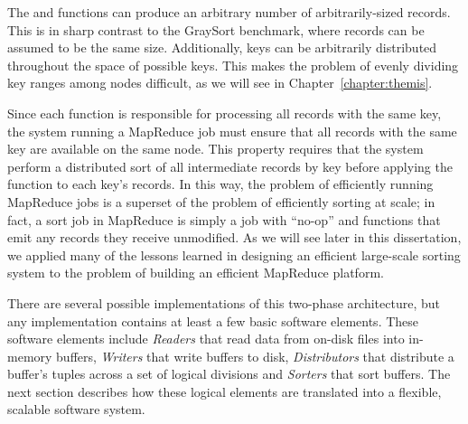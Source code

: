 The \map and \reduce functions can produce an arbitrary number of
arbitrarily-sized records. This is in sharp contrast to the GraySort benchmark,
where records can be assumed to be the same size. Additionally, keys can be
arbitrarily distributed throughout the space of possible keys. This makes the
problem of evenly dividing key ranges among nodes difficult, as we will see in
Chapter~\ref{chapter:themis}.

Since each \reduce function is responsible for processing all records with the
same key, the system running a MapReduce job must ensure that all records with
the same key are available on the same node. This property requires that the
system perform a distributed sort of all intermediate records by key before
applying the \reduce function to each key's records. In this way, the problem
of efficiently running MapReduce jobs is a superset of the problem of
efficiently sorting at scale; in fact, a sort job in MapReduce is simply a job
with ``no-op'' \map and \reduce functions that emit any records they receive
unmodified. As we will see later in this dissertation, we applied many of the
lessons learned in designing an efficient large-scale sorting system to the
problem of building an efficient MapReduce platform.

There are several possible implementations of this two-phase architecture, but
any implementation contains at least a few basic software elements. These
software elements include {\em Readers} that read data from on-disk files into
in-memory buffers, {\em Writers} that write buffers to disk, {\em Distributors}
that distribute a buffer's tuples across a set of logical divisions and {\em
  Sorters} that sort buffers. The next section describes how these logical
elements are translated into a flexible, scalable software system.
